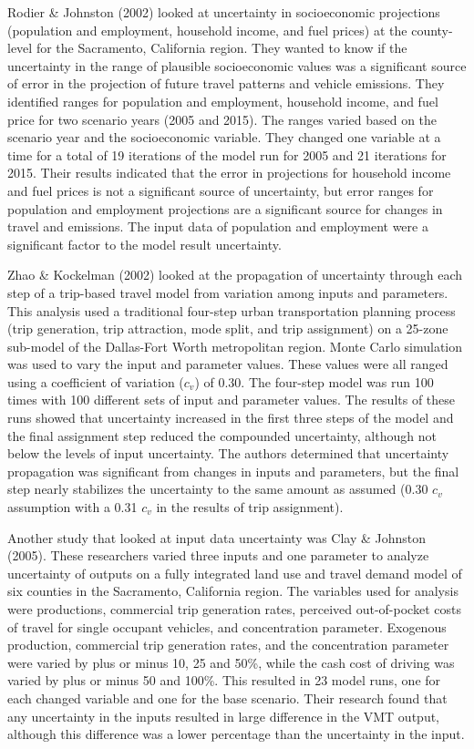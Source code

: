 \documentclass[fancy, masters, twoside]{byuthesis}
\begin{document}
Rodier \& Johnston (2002) looked at uncertainty in socioeconomic projections (population and employment, household income, and fuel prices) at the county-level for the Sacramento, California region. They wanted to know if the uncertainty in the range of plausible socioeconomic values was a significant source of error in the projection of future travel patterns and vehicle emissions. They identified ranges for population and employment, household income, and fuel price for two scenario years (2005 and 2015). The ranges varied based on the scenario year and the socioeconomic variable. They changed one variable at a time for a total of 19 iterations of the model run for 2005 and 21 iterations for 2015. Their results indicated that the error in projections for household income and fuel prices is not a significant source of uncertainty, but error ranges for population and employment projections are a significant source for changes in travel and emissions. The input data of population and employment were a significant factor to the model result uncertainty.

Zhao \& Kockelman (2002) looked at the propagation of uncertainty through each step of a trip-based travel model from variation among inputs and parameters. This analysis used a traditional four-step urban transportation planning process (trip generation, trip attraction, mode split, and trip assignment) on a 25-zone sub-model of the Dallas-Fort Worth metropolitan region. Monte Carlo simulation was used to vary the input and parameter values. These values were all ranged using a coefficient of variation (\(c_v\)) of 0.30. The four-step model was run 100 times with 100 different sets of input and parameter values. The results of these runs showed that uncertainty increased in the first three steps of the model and the final assignment step reduced the compounded uncertainty, although not below the levels of input uncertainty. The authors determined that uncertainty propagation was significant from changes in inputs and parameters, but the final step nearly stabilizes the uncertainty to the same amount as assumed (0.30 \(c_v\) assumption with a 0.31 \(c_v\) in the results of trip assignment).

Another study that looked at input data uncertainty was Clay \& Johnston (2005). These researchers varied three inputs and one parameter to analyze uncertainty of outputs on a fully integrated land use and travel demand model of six counties in the Sacramento, California region. The variables used for analysis were productions, commercial trip generation rates, perceived out-of-pocket costs of travel for single occupant vehicles, and concentration parameter. Exogenous production, commercial trip generation rates, and the concentration parameter were varied by plus or minus 10, 25 and 50\%, while the cash cost of driving was varied by plus or minus 50 and 100\%. This resulted in 23 model runs, one for each changed variable and one for the base scenario. Their research found that any uncertainty in the inputs resulted in large difference in the VMT output, although this difference was a lower percentage than the uncertainty in the input.
\end{document}
